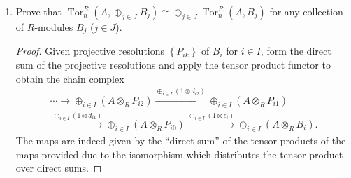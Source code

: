 \documentclass[11pt]{article}
\newcommand{\cbr}[1]{\left\{#1\right\}}
\DeclareMathOperator{\Tor}{Tor}
\DeclareMathOperator{\im}{im}
\DeclareMathOperator{\Hom}{Hom}
\DeclareMathOperator{\Ext}{Ext}
\begin{document}
\begin{enumerate}
\begin{enumerate}
\begin{proof}
            Apply the $\Hom_R(A,-)$ functor and recall the result of Exercise 10.5.12 to obtain the cochain complex \[0\to \prod_{i\in I} \Hom_R(A,B_i) \to\prod_{i\in I}\Hom_R(A,Q_{i0})\xrightarrow{d_1}\prod_{i\in I}\Hom_R(A,Q_{i1})\xrightarrow{d_2}\cdots\] whose cohomology gives the $\Ext$ groups. The first group is given by \[\Ext_R^0(A,\prod_{i\in I}B_i) = \ker(d_1) = \ker(\prod_{i\in I}d_{i1}) \cong \prod_{i\in I}\ker(d_{i1}) = \prod_{i\in I}\Ext_R^0(A,B_i)\] and the rest are \begin{multline*}
                \Ext_R^n(A,\prod_{i\in I}B_i) = \ker(d_{n+1})/\im(d_n) \cong [\prod_{i\in I}\ker(d_{i(n+1)})]/[\prod_{i\in I}\im(d_{in})] \cong \prod_{i\in I}[\ker(d_{i(n+1)})/\im(d_{in})] \\ =\prod_{i\in I}\Ext_R^n(A,B_i).
            \end{multline*}
        \end{proof}
        \item Prove that $\Tor_n^R(A,\oplus_{j\in J}B_j)\cong \oplus_{j\in J}\Tor_n^R(A,B_j)$ for any collection of $R$-modules $B_j$ ($j\in J$). \begin{proof}
            Given projective resolutions $\cbr{P_{ik}}$ of $B_i$ for $i\in I$, form the direct sum of the projective resolutions and apply the tensor product functor to obtain the chain complex \begin{multline*}
                \cdots\to \oplus_{i\in I}(A\otimes_R P_{i2})\xrightarrow{\oplus_{i\in I}(1\otimes d_{i2})}\oplus_{i\in I}(A\otimes_R P_{i1})\\\xrightarrow{\oplus_{i\in I}(1\otimes d_{i1})}\oplus_{i\in I}(A\otimes_R P_{i0})\xrightarrow{\oplus_{i\in I}(1\otimes \epsilon_i)}\oplus_{i\in I}(A\otimes_R B_i).
            \end{multline*} The maps are indeed given by the ``direct sum'' of the tensor products of the maps provided due to the isomorphism which distributes the tensor product over direct sums.
            

\end{proof}
\end{enumerate}
\end{enumerate}
\end{document}
